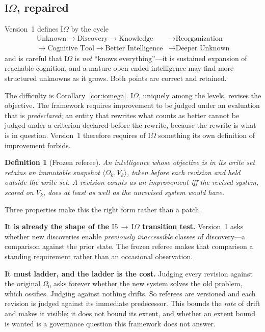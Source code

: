 \documentclass[11pt]{article}
\newtheorem{definition}{Definition}
\newcommand{\Ilev}[1]{\ensuremath{\mathrm{I}#1}}
\newcommand{\IOm}{\ensuremath{\mathrm{I}\Omega}}
\begin{document}
\subsection{\IOm{}, repaired}\label{sec:iomega}

Version~1 defines \IOm{} by the cycle
\[
\begin{aligned}
\text{Unknown} \to \text{Discovery} \to \text{Knowledge} &\to \text{Reorganization}\\
\to \text{Cognitive Tool} \to \text{Better Intelligence} &\to \text{Deeper Unknown}
\end{aligned}
\]
and is careful that \IOm{} is \emph{not} ``knows everything''---it is sustained expansion of reachable cognition, and a mature open-ended intelligence may find more structured unknowns as it grows. Both points are correct and retained.

The difficulty is Corollary~\ref{cor:iomega}. \IOm{}, uniquely among the levels, revises the objective. The framework requires improvement to be judged under an evaluation that is \emph{predeclared}; an entity that rewrites what counts as better cannot be judged under a criterion declared before the rewrite, because the rewrite is what is in question. Version~1 therefore requires of \IOm{} something its own definition of improvement forbids.

\begin{definition}[Frozen referee]
An intelligence whose objective is in its write set retains an immutable snapshot $\langle \Omega_k, V_k \rangle$, taken before each revision and held outside the write set. A revision counts as an improvement iff the revised system, scored on $V_k$, does at least as well as the unrevised system would have.
\end{definition}

Three properties make this the right form rather than a patch.

\textbf{It is already the shape of the \Ilev{5}\,$\to$\,\IOm{} transition test.} Version~1 asks whether new discoveries enable \emph{previously inaccessible} classes of discovery---a comparison against the prior state. The frozen referee makes that comparison a standing requirement rather than an occasional observation.

\textbf{It must ladder, and the ladder is the cost.} Judging every revision against the original $\Omega_0$ asks forever whether the new system solves the old problem, which ossifies. Judging against nothing drifts. So referees are versioned and each revision is judged against its immediate predecessor. This bounds the \emph{rate} of drift and makes it visible; it does not bound its extent, and whether an extent bound is wanted is a governance question this framework does not answer.
\end{document}
